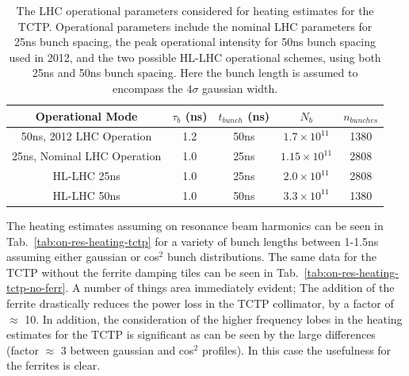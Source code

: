 \begin{table}
\caption{The LHC operational parameters considered for heating estimates for the TCTP. Operational parameters include the nominal LHC parameters for 25ns bunch spacing, the peak operational intensity for 50ns bunch spacing used in 2012, and the two possible HL-LHC operational schemes, using both 25ns and 50ns bunch spacing. Here the bunch length is assumed to encompass the $4\sigma$ gaussian width.}
\label{tab:lhc-tctp-heating-para}
\begin{center}
\begin{tabular}{c | c | c | c | c }
Operational Mode & $\tau_{b}$ (ns) & $t_{bunch}$ (ns) & $N_{b}$ & $n_{bunches}$ \\ \hline
50ns, 2012 LHC Operation & 1.2 & 50ns & $1.7 \times 10^{11}$ & 1380 \\ \hline
25ns, Nominal LHC Operation & 1.0 & 25ns & $1.15 \times 10^{11}$ & 2808 \\ \hline
HL-LHC 25ns & 1.0 & 25ns & $2.0 \times 10^{11}$ & 2808 \\ \hline
HL-LHC 50ns & 1.0 & 50ns & $3.3 \times 10^{11}$ & 1380 \\ \hline
\end{tabular}
\end{center}
\end{table}

The heating estimates assuming on resonance beam harmonics can be seen in Tab.~\ref{tab:on-res-heating-tctp} for a variety of bunch lengths between 1-1.5ns assuming either gaussian or cos$^{2}$ bunch distributions. The same data for the TCTP without the ferrite damping tiles can be seen in Tab.~\ref{tab:on-res-heating-tctp-no-ferr}. A number of things area immediately evident; The addition of the ferrite drastically reduces the power loss in the TCTP collimator, by a factor of $\approx$ 10. In addition, the consideration of the higher frequency lobes in the heating estimates for the TCTP is significant as can be seen by the large differences (factor $\approx$ 3 between gaussian and cos$^{2}$ profiles). In this case the usefulness for the ferrites is clear.

